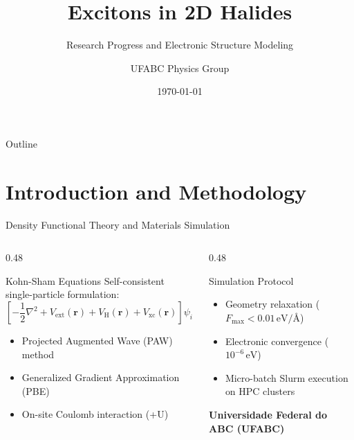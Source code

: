 \documentclass[aspectratio=169, sectionpages, codemintedoverleaf, bibref]{beamer}
\title{Excitons in 2D Halides}
\subtitle{Research Progress and Electronic Structure Modeling}
\author{UFABC Physics Group}
\institute{Universidade Federal do ABC (UFABC)}
\date{\today}
\begin{document}
\titlepage

\begin{frame}{Outline}
  \tableofcontents
\end{frame}

\section{Introduction and Methodology}

\begin{frame}{Density Functional Theory and Materials Simulation}
  \begin{columns}[T]
    \begin{column}{0.48\textwidth}
      \begin{block}{Kohn-Sham Equations}
        Self-consistent single-particle formulation:
        \[
          \left[ -\frac{1}{2}\nabla^2 + V_{\text{ext}}(\mathbf{r}) + V_{\text{H}}(\mathbf{r}) + V_{\text{xc}}(\mathbf{r}) \right] \psi_i(\mathbf{r}) = \varepsilon_i \psi_i(\mathbf{r})
        \]
      \end{block}
      \begin{itemize}
        \item Projected Augmented Wave (PAW) method
        \item Generalized Gradient Approximation (PBE)
        \item On-site Coulomb interaction (+U)
      \end{itemize}
    \end{column}

    \begin{column}{0.48\textwidth}
      \begin{exampleblock}{Simulation Protocol}
        \begin{itemize}
          \item Geometry relaxation ($F_{\text{max}} < 0.01\,\text{eV/\AA}$)
          \item Electronic convergence ($10^{-6}\,\text{eV}$)
          \item Micro-batch Slurm execution on HPC clusters
        \end{itemize}
      \end{exampleblock}
      \vspace{1em}
      \centering
      {\small \textcolor{nordEight}{\textbf{Universidade Federal do ABC (UFABC)}}}
    \end{column}
  \end{columns}
\end{frame}
\end{document}
